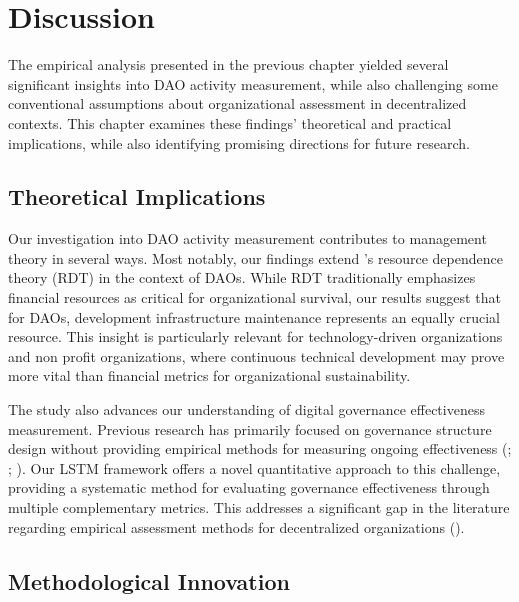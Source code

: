 \chapter{Discussion}

The empirical analysis presented in the previous chapter yielded several significant insights into DAO activity measurement, while also challenging some conventional assumptions about organizational assessment in decentralized contexts. This chapter examines these findings' theoretical and practical implications, while also identifying promising directions for future research.

\section{Theoretical Implications}

Our investigation into DAO activity measurement contributes to management theory in several ways. Most notably, our findings extend \textcite{pfeffer2015external}'s resource dependence theory (RDT) in the context of DAOs. While RDT traditionally emphasizes financial resources as critical for organizational survival, our results suggest that for DAOs, development infrastructure maintenance represents an equally crucial resource. This insight is particularly relevant for technology-driven organizations and non profit organizations, where continuous technical development may prove more vital than financial metrics for organizational sustainability.

The study also advances our understanding of digital governance effectiveness measurement. Previous research has primarily focused on governance structure design without providing empirical methods for measuring ongoing effectiveness (\cite{chohan2017decentralized}; \cite{wang2019decentralized}; \cite{rikken2019governance}). Our LSTM framework offers a novel quantitative approach to this challenge, providing a systematic method for evaluating governance effectiveness through multiple complementary metrics. This addresses a significant gap in the literature regarding empirical assessment methods for decentralized organizations (\cite{tan2023open}).

\section{Methodological Innovation}

